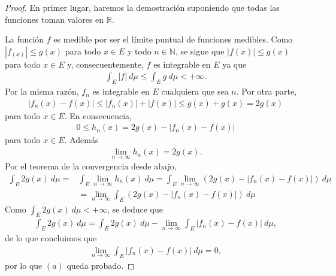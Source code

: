 \begin{proof}
    En primer lugar, haremos la demostración suponiendo que todas las funciones toman valores en $\mathbb{R}$.

    La función $f$ es medible por ser el límite puntual de funciones medibles. Como $|f_(x)| \leq g(x)$ para todo $x \in E$ y todo $n \in \mathbb{N}$, se sigue que $|f(x)| \leq g(x)$ para todo $x \in E$ y, consecuentemente, $f$ es integrable en $E$ ya que
    \begin{align*}
        \int_{E}{|f| \ d\mu} \leq \int_{E}{g \ d\mu} < +\infty.
    \end{align*}
    Por la misma razón, $f_n$ es integrable en $E$ cualquiera que sea $n$. Por otra parte,
    \begin{align*}
        |f_n(x) - f(x)| \leq |f_n(x)| + |f(x)| \leq g(x) + g(x) = 2g(x)
    \end{align*}
    para todo $x \in E$. En consecuencia,
    \begin{align*}
        0 \leq h_n(x) = 2g(x) - |f_n(x) - f(x)|
    \end{align*}
    para todo $x \in E$. Además
    \begin{align*}
        \lim_{n \to \infty}{h_n(x)} = 2g(x).
    \end{align*}
    Por el teorema de la convergencia desde abajo,
    \begin{align*}
        \int_{E}{2g(x) \ d\mu} = & \int_{E}{\lim_{n \to \infty}{h_n(x)} \ d\mu} = \int_{E}\lim_{n \to \infty}{(2g(x) - |f_n(x) - f(x)| ) \ d\mu} \\
                                 & = \lim_{n \to \infty}{\int_{E}{(2g(x) - |f_n(x) - f(x)| ) \ d\mu}}
    \end{align*}
    Como $\int_{E}{2g(x) \ d\mu} < +\infty$, se deduce que
    \begin{align*}
        \int_{E}{2g(x) \ d\mu} = \int_{E}{2g(x) \ d\mu} - \lim_{n \to \infty}{\int_{E}{|f_n(x) - f(x)| \ d\mu}},
    \end{align*}
    de lo que concluimos que
    \begin{align*}
        \lim_{n \to \infty}{\int_{E}{|f_n(x) - f(x)| \ d\mu}} = 0,
    \end{align*}
    por lo que $(a)$ queda probado.


\end{proof}
